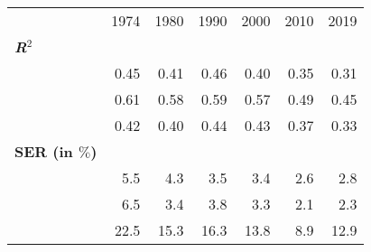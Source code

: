 \begin{tabular}{lllllll}
\cline{1-7}
\multicolumn{1}{c}{} &
  \multicolumn{1}{|r}{1974} &
  \multicolumn{1}{r}{1980} &
  \multicolumn{1}{r}{1990} &
  \multicolumn{1}{r}{2000} &
  \multicolumn{1}{r}{2010} &
  \multicolumn{1}{r}{2019} \\
\cline{1-7}
\multicolumn{1}{l}{\textbf{\textit{R}$^2$}} &
  \multicolumn{1}{|r}{} &
  \multicolumn{1}{r}{} &
  \multicolumn{1}{r}{} &
  \multicolumn{1}{r}{} &
  \multicolumn{1}{r}{} &
  \multicolumn{1}{r}{} \\
\multicolumn{1}{l}{\hspace{1em}{Model (A)}} &
  \multicolumn{1}{|r}{0.45} &
  \multicolumn{1}{r}{0.41} &
  \multicolumn{1}{r}{0.46} &
  \multicolumn{1}{r}{0.40} &
  \multicolumn{1}{r}{0.35} &
  \multicolumn{1}{r}{0.31} \\
\multicolumn{1}{l}{\hspace{1em}{Model (B)}} &
  \multicolumn{1}{|r}{0.61} &
  \multicolumn{1}{r}{0.58} &
  \multicolumn{1}{r}{0.59} &
  \multicolumn{1}{r}{0.57} &
  \multicolumn{1}{r}{0.49} &
  \multicolumn{1}{r}{0.45} \\
\multicolumn{1}{l}{\hspace{1em}{Model (C)}} &
  \multicolumn{1}{|r}{0.42} &
  \multicolumn{1}{r}{0.40} &
  \multicolumn{1}{r}{0.44} &
  \multicolumn{1}{r}{0.43} &
  \multicolumn{1}{r}{0.37} &
  \multicolumn{1}{r}{0.33} \\
\multicolumn{1}{l}{\textbf{SER (in $\%$)}} &
  \multicolumn{1}{|r}{} &
  \multicolumn{1}{r}{} &
  \multicolumn{1}{r}{} &
  \multicolumn{1}{r}{} &
  \multicolumn{1}{r}{} &
  \multicolumn{1}{r}{} \\
\multicolumn{1}{l}{\hspace{1em}{Model (A)}} &
  \multicolumn{1}{|r}{5.5} &
  \multicolumn{1}{r}{4.3} &
  \multicolumn{1}{r}{3.5} &
  \multicolumn{1}{r}{3.4} &
  \multicolumn{1}{r}{2.6} &
  \multicolumn{1}{r}{2.8} \\
\multicolumn{1}{l}{\hspace{1em}{Model (B)}} &
  \multicolumn{1}{|r}{6.5} &
  \multicolumn{1}{r}{3.4} &
  \multicolumn{1}{r}{3.8} &
  \multicolumn{1}{r}{3.3} &
  \multicolumn{1}{r}{2.1} &
  \multicolumn{1}{r}{2.3} \\
\multicolumn{1}{l}{\hspace{1em}{Model (C)}} &
  \multicolumn{1}{|r}{22.5} &
  \multicolumn{1}{r}{15.3} &
  \multicolumn{1}{r}{16.3} &
  \multicolumn{1}{r}{13.8} &
  \multicolumn{1}{r}{8.9} &
  \multicolumn{1}{r}{12.9} \\

\end{tabular}
